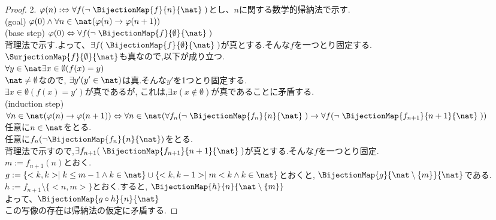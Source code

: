 \begin{proof} 2. $\varphi (n) :\Leftrightarrow \forall f( \lnot \; \BijectionMap{f}{n}{\nat} \; )$とし、$n$に関する数学的帰納法で示す.\\
(goal) $\varphi (0) \land \forall n \in \nat ( \varphi (n) \rightarrow \varphi (n+1))$\\

(base step) $\varphi (0) \Leftrightarrow  \forall f( \lnot \; \BijectionMap{f}{\emptyset}{\nat} \; )$ \\
背理法で示す.よって、$\exists f(  \; \BijectionMap{f}{\emptyset}{\nat} \; )$が真とする.そんな$f$を一つとり固定する.\\
$\SurjectionMap{f}{\emptyset}{\nat}$も真なので,以下が成り立つ.\\
$\forall y \in \nat \exists x \in \emptyset (f(x) = y)$\\
$\nat \neq \emptyset$なので,
$\exists y'(y' \in \nat)$は真.そんな$y'$を1つとり固定する.\\
$\exists x \in \emptyset (f(x) = y')$が真であるが,
これは,$\exists x (x \not\in \emptyset)$が真であることに矛盾する.\\

(induction step) $\forall n \in \nat ( \varphi (n) \rightarrow \varphi (n+1)) 
\Leftrightarrow \forall n \in \nat ( \forall f_n( \lnot \; \BijectionMap{f_n}{n}{\nat} \; ) \rightarrow \forall f( \lnot \; \BijectionMap{f_{n+1}}{n+1}{\nat} \; ))$\\
任意に$n \in \nat$をとる.\\
任意に$f_n(\lnot \BijectionMap{f_n}{n}{\nat})$をとる.\\
背理法で示すので,$\exists f_{n+1}(\; \BijectionMap{f_{n+1}}{n+1}{\nat} \; )$が真とする.そんな$f$を一つとり固定.\\
$m := f_{n+1}(n)$とおく.\\
$g:=\{<k,k> \mid k \leq m-1 \land k \in \nat\} \cup \{<k,k-1> \mid m < k \land k \in \nat\}$とおくと,
$\BijectionMap{g}{\nat \setminus \{m\}}{\nat}$である.\\
$h:= f_{n+1} \setminus \{<n, m>\}$とおく.すると,
$\BijectionMap{h}{n}{\nat \setminus \{m\}}$\\
よって、$\BijectionMap{g \circ h}{n}{\nat}$\\
この写像の存在は帰納法の仮定に矛盾する.
\end{proof}
